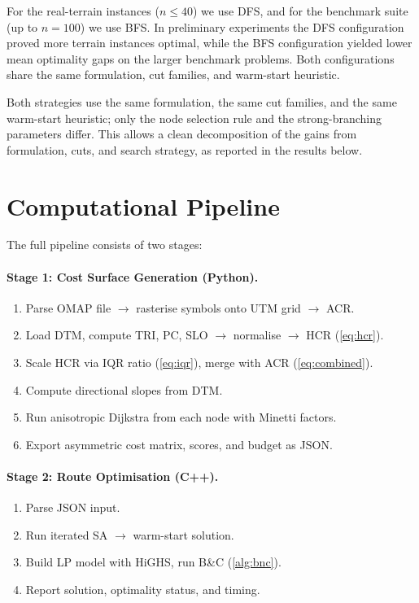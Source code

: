 \documentclass[11pt,a4paper]{article}
\begin{document}
For the real-terrain instances ($n \leq 40$) we use DFS, and for the benchmark suite (up to $n = 100$) we use BFS.
In preliminary experiments the DFS configuration proved more terrain instances optimal, while the BFS configuration yielded lower mean optimality gaps on the larger benchmark problems.
Both configurations share the same formulation, cut families, and warm-start heuristic.

Both strategies use the same formulation, the same cut families, and the same warm-start heuristic; only the node selection rule and the strong-branching parameters differ.
This allows a clean decomposition of the gains from formulation, cuts, and search strategy, as reported in the results below.

\section{Computational Pipeline}
\label{sec:pipeline}

The full pipeline consists of two stages:

\paragraph{Stage 1: Cost Surface Generation (Python).}
\begin{enumerate}[nosep]
  \item Parse OMAP file $\to$ rasterise symbols onto UTM grid $\to$ ACR.
  \item Load DTM, compute TRI, PC, SLO $\to$ normalise $\to$ HCR (\cref{eq:hcr}).
  \item Scale HCR via IQR ratio (\cref{eq:iqr}), merge with ACR (\cref{eq:combined}).
  \item Compute directional slopes from DTM.
  \item Run anisotropic Dijkstra from each node with Minetti factors.
  \item Export asymmetric cost matrix, scores, and budget as JSON.
\end{enumerate}

\paragraph{Stage 2: Route Optimisation (C++).}
\begin{enumerate}[nosep]
  \item Parse JSON input.
  \item Run iterated SA $\to$ warm-start solution.
  \item Build LP model with HiGHS, run B\&C (\cref{alg:bnc}).
  \item Report solution, optimality status, and timing.
\end{enumerate}
\end{document}
